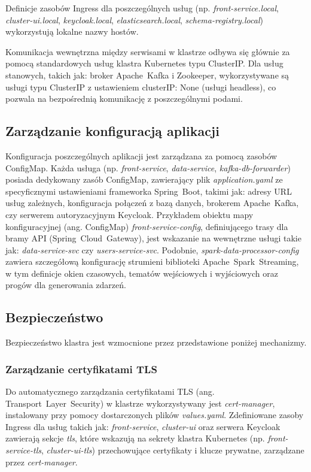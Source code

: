 Definicje zasobów Ingress dla poszczególnych usług (np. \textit{front-service.local}, \textit{cluster-ui.local}, \textit{keycloak.local}, \textit{elasticsearch.local}, \textit{schema-registry.local}) wykorzystują lokalne nazwy hostów.

Komunikacja wewnętrzna między serwisami w klastrze odbywa się głównie za pomocą standardowych usług klastra Kubernetes typu ClusterIP. Dla usług stanowych, takich jak: broker \mbox{Apache Kafka} i Zookeeper, wykorzystywane są usługi typu ClusterIP z ustawieniem clusterIP: None (usługi headless), co pozwala na bezpośrednią komunikację z poszczególnymi podami.

\subsection{Zarządzanie konfiguracją aplikacji} 

Konfiguracja poszczególnych aplikacji jest zarządzana za pomocą zasobów ConfigMap. Każda usługa (np. \textit{front-service}, \textit{data-service}, \textit{kafka-db-forwarder}) posiada dedykowany zasób \mbox{ConfigMap}, zawierający plik \textit{application.yaml} ze specyficznymi ustawieniami frameworka \mbox{Spring Boot}, takimi jak: adresy URL usług zależnych, konfiguracja połączeń z bazą danych, brokerem \mbox{Apache Kafka}, czy serwerem autoryzacyjnym Keycloak.
\newpage
Przykładem obiektu mapy konfiguracyjnej (ang. \mbox{ConfigMap}) \textit{front-service-config}, definiującego trasy dla bramy API (\mbox{Spring Cloud Gateway}), jest wskazanie na wewnętrzne usługi takie jak: \textit{data-service-svc} czy \textit{users-service-svc}. Podobnie, \textit{spark-data-processor-config} zawiera szczegółową konfigurację strumieni biblioteki \mbox{Apache Spark Streaming}, w tym definicje okien czasowych, tematów wejściowych i wyjściowych oraz progów dla generowania zdarzeń.

\subsection{Bezpieczeństwo}

Bezpieczeństwo klastra jest wzmocnione przez przedstawione poniżej mechanizmy.

\subsubsection{Zarządzanie certyfikatami TLS}
Do automatycznego zarządzania certyfikatami TLS (ang. \mbox{Transport Layer Security}) w klastrze wykorzystywany jest \textit{cert-manager}, instalowany przy pomocy dostarczonych plików \textit{values.yaml}. Zdefiniowane zasoby Ingress dla usług takich jak: \textit{front-service}, \textit{cluster-ui} oraz serwera Keycloak zawierają sekcje \textit{tls}, które wskazują na sekrety klastra Kubernetes (np. \textit{front-service-tls}, \textit{cluster-ui-tls}) przechowujące certyfikaty i klucze prywatne, zarządzane przez \textit{cert-manager}.

